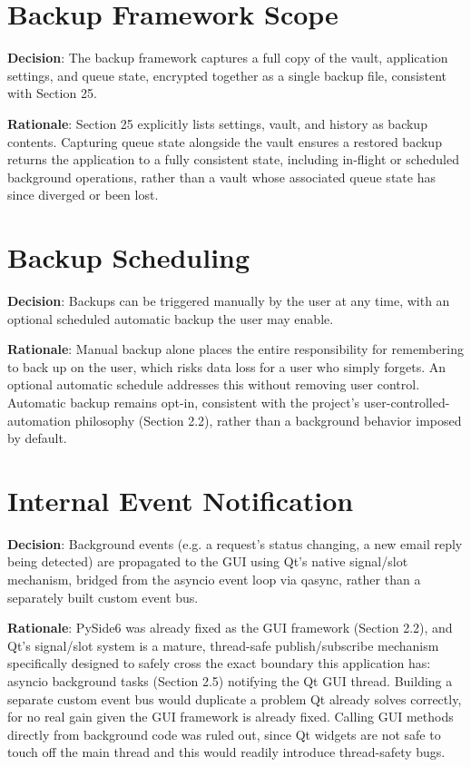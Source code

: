 \section{Backup Framework Scope}
\textbf{Decision}: The backup framework captures a full copy of the vault, application settings, and queue state, encrypted together as a single backup file, consistent with Section 25.

\textbf{Rationale}: Section 25 explicitly lists settings, vault, and history as backup contents. Capturing queue state alongside the vault ensures a restored backup returns the application to a fully consistent state, including in-flight or scheduled background operations, rather than a vault whose associated queue state has since diverged or been lost.
\section{Backup Scheduling}
\textbf{Decision}: Backups can be triggered manually by the user at any time, with an optional scheduled automatic backup the user may enable.

\textbf{Rationale}: Manual backup alone places the entire responsibility for remembering to back up on the user, which risks data loss for a user who simply forgets. An optional automatic schedule addresses this without removing user control. Automatic backup remains opt-in, consistent with the project's user-controlled-automation philosophy (Section 2.2), rather than a background behavior imposed by default.
\section{Internal Event Notification}
\textbf{Decision}: Background events (e.g. a request's status changing, a new email reply being detected) are propagated to the GUI using Qt's native signal/slot mechanism, bridged from the asyncio event loop via qasync, rather than a separately built custom event bus.

\textbf{Rationale}: PySide6 was already fixed as the GUI framework (Section 2.2), and Qt's signal/slot system is a mature, thread-safe publish/subscribe mechanism specifically designed to safely cross the exact boundary this application has: asyncio background tasks (Section 2.5) notifying the Qt GUI thread. Building a separate custom event bus would duplicate a problem Qt already solves correctly, for no real gain given the GUI framework is already fixed. Calling GUI methods directly from background code was ruled out, since Qt widgets are not safe to touch off the main thread and this would readily introduce thread-safety bugs.

\sentinelchapterend